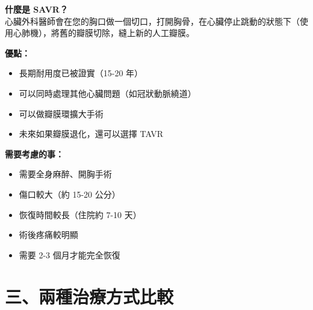 \documentclass[12pt,a4paper]{article}
\begin{document}
\vspace{0.8cm}

\begin{tcolorbox}[
    colback=green!5,
    colframe=pda_green,
    title={\Large\bfseries 選項 B：外科主動脈瓣膜置換術 (SAVR)},
    fonttitle=\bfseries\color{white},
    coltitle=white,
    colbacktitle=pda_green,
    arc=10pt,
    boxrule=2pt
]

\textbf{\large 什麼是 SAVR？}\\[0.3cm]
心臟外科醫師會在您的胸口做一個切口，打開胸骨，在心臟停止跳動的狀態下（使用心肺機），將舊的瓣膜切除，縫上新的人工瓣膜。

\vspace{0.5cm}

\begin{minipage}[t]{0.48\textwidth}
\textbf{\textcolor{pda_green}{優點：}}
\begin{itemize}[leftmargin=*, itemsep=3pt]
    \item 長期耐用度已被證實（15-20 年）
    \item 可以同時處理其他心臟問題（如冠狀動脈繞道）
    \item 可以做瓣膜環擴大手術
    \item 未來如果瓣膜退化，還可以選擇 TAVR
\end{itemize}
\end{minipage}
\hfill
\begin{minipage}[t]{0.48\textwidth}
\textbf{\textcolor{emergency_red}{需要考慮的事：}}
\begin{itemize}[leftmargin=*, itemsep=3pt]
    \item 需要全身麻醉、開胸手術
    \item 傷口較大（約 15-20 公分）
    \item 恢復時間較長（住院約 7-10 天）
    \item 術後疼痛較明顯
    \item 需要 2-3 個月才能完全恢復
\end{itemize}
\end{minipage}

\end{tcolorbox}

\newpage

\section*{\textcolor{emergency_red}{\Large 三、兩種治療方式比較}}
\end{document}

